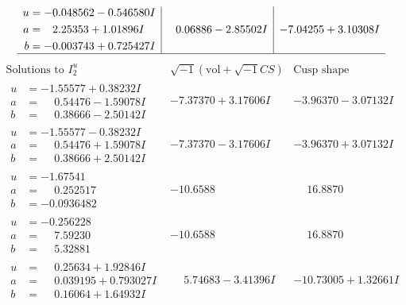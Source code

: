 \documentclass[1p]{elsarticle_modified}
\theoremstyle{definition}
\newcommand{\I}{\sqrt{-1}}
\begin{document}
$$\begin{array}{c|c|c}
\begin{aligned}
u &= -0.048562 - 0.546580 I \\
a &= \phantom{-}2.25353 + 1.01896 I \\
b &= -0.003743 + 0.725427 I\end{aligned}
 & \phantom{-}0.06886 - 2.85502 I & -7.04255 + 3.10308 I\\
 \hline 
 \end{array}$$\newpage$$\begin{array}{c|c|c}  
\text{Solutions to }I^u_{2}& \I (\text{vol} + \sqrt{-1}CS) & \text{Cusp shape}\\
 \hline 
\begin{aligned}
u &= -1.55577 + 0.38232 I \\
a &= \phantom{-}0.54476 - 1.59078 I \\
b &= \phantom{-}0.38666 - 2.50142 I\end{aligned}
 & -7.37370 + 3.17606 I & -3.96370 - 3.07132 I \\ \hline\begin{aligned}
u &= -1.55577 - 0.38232 I \\
a &= \phantom{-}0.54476 + 1.59078 I \\
b &= \phantom{-}0.38666 + 2.50142 I\end{aligned}
 & -7.37370 - 3.17606 I & -3.96370 + 3.07132 I \\ \hline\begin{aligned}
u &= -1.67541\phantom{ +0.000000I} \\
a &= \phantom{-}0.252517\phantom{ +0.000000I} \\
b &= -0.0936482\phantom{ +0.000000I}\end{aligned}
 & -10.6588\phantom{ +0.000000I} & \phantom{-}16.8870\phantom{ +0.000000I} \\ \hline\begin{aligned}
u &= -0.256228\phantom{ +0.000000I} \\
a &= \phantom{-}7.59230\phantom{ +0.000000I} \\
b &= \phantom{-}5.32881\phantom{ +0.000000I}\end{aligned}
 & -10.6588\phantom{ +0.000000I} & \phantom{-}16.8870\phantom{ +0.000000I} \\ \hline\begin{aligned}
u &= \phantom{-}0.25634 + 1.92846 I \\
a &= \phantom{-}0.039195 + 0.793027 I \\
b &= \phantom{-}0.16064 + 1.64932 I\end{aligned}
 & \phantom{-}5.74683 - 3.41396 I & -10.73005 + 1.32661 I \\ \hline\begin{aligned}

\end{aligned}
\end{array}$$
\end{document}
